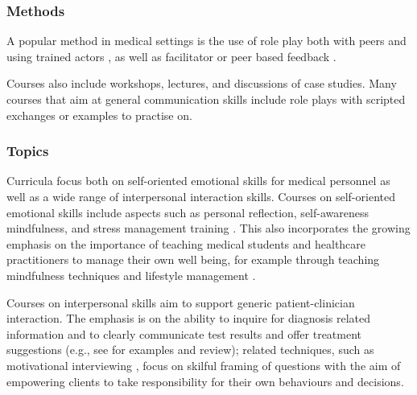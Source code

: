 \documentclass[prodmode,acmtochi]{acmsmall}
\newcommand{\GeraldineFIX}[1]{}
\newcommand{\GeraldineTODO}[1]{}
\begin{document}
\subsubsection*{Methods} A popular method in medical settings is the use of role play both with peers and using trained actors  \cite{Stepien2006,Stiefel2010,Kalet2004,Barth2011}, as well as facilitator or peer based feedback \cite{Rao2007}. 
\GeraldineFIX{G: \textbf{(G: on what?\ on the role plays, or is this another method ie not clear what 'followed by' refers to ... popularity or how role play is used)}}
Courses also include workshops, lectures, and discussions of case studies. Many courses that aim at general communication skills include role plays with scripted exchanges or examples to practise on. 
 \textbf{\GeraldineFIX{G: (G:\ how are these different to role plays??) P: These a specific sub-part of role plays (i.e., you can have other role plays without scripted exchange). I believe it is worth mentioning as such scripted (iu.e., fixed) exchanges can be readily supported by technology.}}


\subsubsection*{Topics} 
Curricula focus both on self-oriented emotional skills for medical personnel as well as a wide range of interpersonal interaction skills. 
%
Courses on self-oriented emotional skills include aspects such as personal reflection, self-awareness mindfulness, and stress management training \cite{Shapiro2000,Epstein1999,Satterfield2007}. This also incorporates the growing emphasis on the importance of teaching medical students and healthcare practitioners to manage their own well being, for example through teaching mindfulness techniques and lifestyle management \cite{Hassed2009}.
\GeraldineTODO{G: add in sentence or two (maybe as above?)about self-care courses eg the mindfulness courses at Monash eg Hassed et al 2009 - ref in comment)}

        Courses on interpersonal skills aim to support generic patient-clinician interaction. The emphasis is on the ability to inquire for diagnosis related information and to clearly communicate test results and offer  treatment suggestions (e.g., see \cite{Kalet2004,Barth2011} for examples and review); related techniques, such as  motivational interviewing \cite{Hettema2005},  focus on skilful framing of questions with the aim of empowering  clients to take responsibility for their own behaviours and decisions.  
%
        
\end{document}
